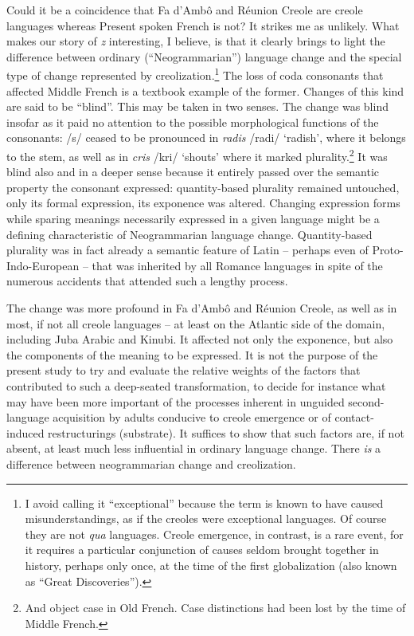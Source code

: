 \documentclass[output=paper]{langscibook}
\begin{document}
Could it be a coincidence that Fa d’Ambô and Réunion Creole are creole languages whereas Present spoken French is not? It strikes me as unlikely. What makes our story of \textit{z} interesting, I believe, is that it clearly brings to light the difference between ordinary (“Neogrammarian”) language change and the special type of change represented by creolization.\footnote{I avoid calling it “exceptional” because the term is known to have caused misunderstandings, as if the creoles were exceptional languages. Of course they are not \textit{qua} languages. Creole emergence, in contrast, is a rare event, for it requires a particular conjunction of causes seldom brought together in history, perhaps only once, at the time of the first globalization (also known as “Great Discoveries”).}  The loss of coda consonants that affected Middle French is a textbook example of the former. Changes of this kind are said to be “blind”. This may be taken in two senses. The change was blind insofar as it paid no attention to the possible morphological functions of the consonants: /s/ ceased to be pronounced in \textit{radis} /radi/ ‘radish’, where it belongs to the stem, as well as in \textit{cris} /kri/ ‘shouts’ where it marked plurality.\footnote{And object case in Old French. Case distinctions had been lost by the time of Middle French.} It was blind also and in a deeper sense because it entirely passed over the semantic property the consonant expressed: quantity-based plurality remained untouched, only its formal expression, its exponence was altered. Changing expression forms while sparing meanings necessarily expressed in a given language might be a defining characteristic of Neogrammarian language change. Quantity-based plurality was in fact already a semantic feature of Latin -- perhaps even of Proto-Indo-European -- that was inherited by all Romance languages in spite of the numerous accidents that attended such a lengthy process.

The change was more profound in Fa d’Ambô and Réunion Creole, as well as in most, if not all creole languages -- at least on the Atlantic side of the domain, including Juba Arabic and Kinubi. It affected not only the exponence, but also the components of the meaning to be expressed. It is not the purpose of the present study to try and evaluate the relative weights of the factors that contributed to such a deep-seated transformation, to decide for instance what may have been more important of the processes inherent in unguided second-language acquisition by adults conducive to creole emergence or of contact-induced restructurings (substrate). It suffices to show that such factors are, if not absent, at least much less influential in ordinary language change. There \textit{is} a difference between neogrammarian change and creolization.
\end{document}
